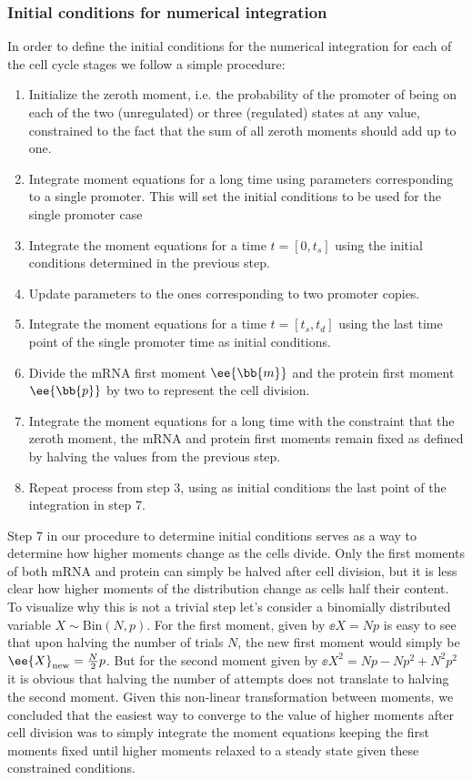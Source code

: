 \subsubsection{Initial conditions for numerical integration}

In order to define the initial conditions for the numerical integration for each
of the cell cycle stages we follow a simple procedure:
\begin{enumerate}
  \item Initialize the zeroth moment, i.e. the probability of the promoter of
  being on each of the two (unregulated) or three (regulated) states at any
  value, constrained to the fact that the sum of all zeroth moments should add
  up to one.
  \item Integrate moment equations for a long time using parameters
  corresponding to a single promoter. This will set the initial conditions to
  be used for the single promoter case
  \item Integrate the moment equations for a time $t = [0, t_s]$ using the
  initial conditions determined in the previous step.
  \item Update parameters to the ones corresponding to two promoter copies.
  \item Integrate the moment equations for a time $t = [t_s, t_d]$ using the
  last time point of the single promoter time as initial conditions.
  \item Divide the mRNA first moment $\ee{\bb{m}}$ and the protein first moment
  $\ee{\bb{p}}$ by two to represent the cell division.
  \item Integrate the moment equations for a long time with the constraint that
  the zeroth moment, the mRNA and protein first moments remain fixed as defined
  by halving the values from the previous step.
  \item Repeat process from step 3, using as initial conditions the last point
  of the integration in step 7.
\end{enumerate}

Step 7 in our procedure to determine initial conditions serves as a way to
determine how higher moments change as the cells divide. Only the first moments
of both mRNA and protein can simply be halved after cell division, but it is
less clear how higher moments of the distribution change as cells half their
content. To visualize why this is not a trivial step let's consider a binomially
distributed variable $X \sim \text{Bin}(N, p)$. For the first moment, given by
$\ee{X} = Np$ is easy to see that upon halving the number of trials $N$, the new
first moment would simply be $\ee{X}_{\text{new}} = {N \over 2} p$. But for the
second moment given by $\ee{X^2} = Np - Np^2 + N^2p^2$ it is obvious that
halving the number of attempts does not translate to halving the second moment.
Given this non-linear transformation between moments, we concluded that the
easiest way to converge to the value of higher moments after cell division was
to simply integrate the moment equations keeping the first moments fixed until
higher moments relaxed to a steady state given these constrained conditions.

